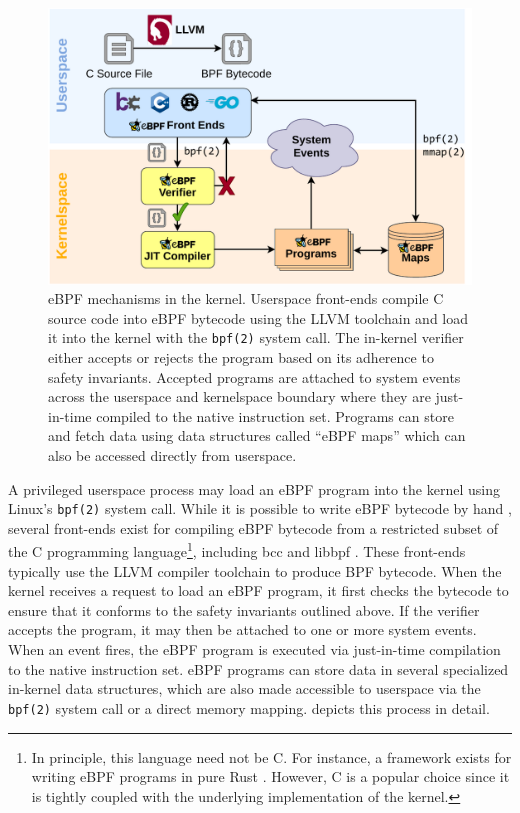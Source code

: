 \begin{figure}[htb]
  \centering
  \includegraphics[width=0.8\linewidth]{figs/ebpf.pdf}
  \caption{
    eBPF mechanisms in the kernel. Userspace front-ends compile C source code into eBPF bytecode using the LLVM toolchain and load it into the kernel with the \texttt{bpf(2)} system call. The in-kernel verifier either accepts or rejects the program based on its adherence to safety invariants. Accepted programs are attached to system events across the userspace and kernelspace boundary where they are just-in-time compiled to the native instruction set. Programs can store and fetch data using data structures called \enquote{eBPF maps} which can also be accessed directly from userspace.
  }%
  \label{fig:ebpf}
\end{figure}

A privileged userspace process may load an eBPF program into the kernel using Linux's \texttt{bpf(2)} system call. While it is possible to write eBPF bytecode by hand \cite{gregg2019_bpf}, several front-ends exist for compiling eBPF bytecode from a restricted subset of the C programming language\footnote{In principle, this language need not be C. For instance, a framework exists for writing eBPF programs in pure Rust \cite{redbpf}. However, C is a popular choice since it is tightly coupled with the underlying implementation of the kernel.}, including bcc \cite{bcc} and libbpf \cite{libbpf}. These front-ends typically use the LLVM \cite{llvm_bpf} compiler toolchain to produce BPF bytecode. When the kernel receives a request to load an eBPF program, it first checks the bytecode to ensure that it conforms to the safety invariants outlined above. If the verifier accepts the program, it may then be attached to one or more system events. When an event fires, the eBPF program is executed via just-in-time compilation to the native instruction set. eBPF programs can store data in several specialized in-kernel data structures, which are also made accessible to userspace via the \texttt{bpf(2)} system call or a direct memory mapping.  depicts this process in detail.


